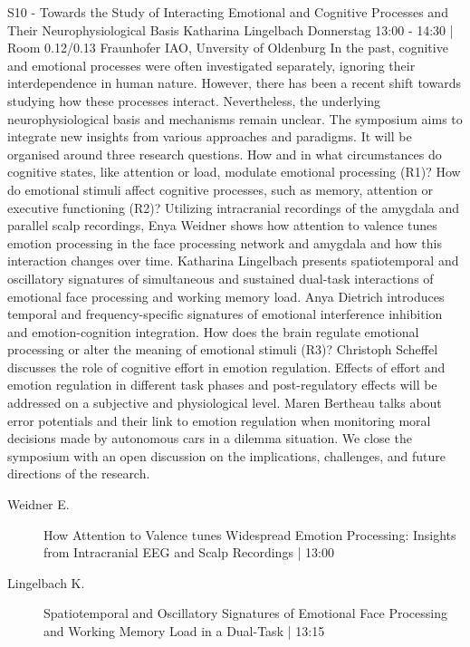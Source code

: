 
            \begin{symposium}
            {S10 - Towards the Study of Interacting Emotional and Cognitive Processes and Their Neurophysiological Basis}
            {Katharina Lingelbach}
            {Donnerstag 13:00 - 14:30 | Room 0.12/0.13}
            {Fraunhofer IAO, Unversity of Oldenburg}
            In the past, cognitive and emotional processes were often investigated separately, ignoring their interdependence in human nature. However, there has been a recent shift towards studying how these processes interact. Nevertheless, the underlying neurophysiological basis and mechanisms remain unclear.
The symposium aims to integrate new insights from various approaches and paradigms. It will be organised around three research questions. How and in what circumstances do cognitive states, like attention or load, modulate emotional processing (R1)? How do emotional stimuli affect cognitive processes, such as memory, attention or executive functioning (R2)?
Utilizing intracranial recordings of the amygdala and parallel scalp recordings, Enya Weidner shows how attention to valence tunes emotion processing in the face processing network and amygdala and how this interaction changes over time. Katharina Lingelbach presents spatiotemporal and oscillatory signatures of simultaneous and sustained dual-task interactions of emotional face processing and working memory load. Anya Dietrich introduces temporal and frequency-specific signatures of emotional interference inhibition and emotion-cognition integration.
How does the brain regulate emotional processing or alter the meaning of emotional stimuli (R3)?
Christoph Scheffel discusses the role of cognitive effort in emotion regulation. Effects of effort and emotion regulation in different task phases and post-regulatory effects will be addressed on a subjective and physiological level. Maren Bertheau talks about error potentials and their link to emotion regulation when monitoring moral decisions made by autonomous cars in a dilemma situation.
We close the symposium with an open discussion on the implications, challenges, and future directions of the research.
            \begin{description}    
            
                \item [ Weidner E.] How Attention to Valence tunes Widespread Emotion Processing: Insights from Intracranial EEG and Scalp Recordings \textcolor{mygray}{ | 13:00}    
                
                \item [ Lingelbach K.] Spatiotemporal and Oscillatory Signatures of Emotional Face Processing and Working Memory Load in a Dual-Task \textcolor{mygray}{ | 13:15}    
                

\end{description}
\end{symposium}
